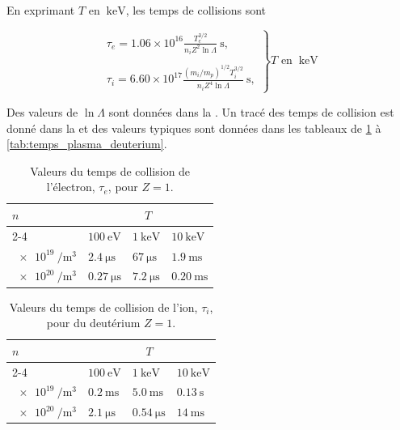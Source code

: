 \documentclass[main.tex]{subfiles}
\begin{document}
En exprimant \( T \) en \( \SI{}{\kilo\electronvolt} \), les temps de collisions sont

\begin{equation}
	\left. \begin{matrix}
		\tau_e = 1.06 \times 10^{16} \frac{T_e^{3/2}}{n_i Z^2 \ln \Lambda} \SI{}{\second},\\
		\\
		\tau_i = 6.60 \times 10^{17} \frac{\left( m_i/m_p\right)^{1/2}T_i^{3/2}}{n_i Z^4 \ln \Lambda} \SI{}{\second},
	\end{matrix} \right\rbrace T \text{ en } \SI{}{\kilo\electronvolt}
	\label{eq:temps_caracteristique_keV}
\end{equation}

Des valeurs de \( \ln\Lambda \) sont données dans la \color{red}{Section 14.5 (lien à rajouter quand elle sera faite)}\color{black}.
Un tracé des temps de collision est donné dans la \color{red}{Section 14.6 (lien à rajouter quand elle sera faite)}\color{black} et des valeurs typiques sont données dans les tableaux de \ref{tab:temps_electron} à \ref{tab:temps_plasma_deuterium}.

\begin{table}[ h ]
	\centering
	\caption{Valeurs du temps de collision de l'électron, \( \tau_e \), pour \( Z=1 \).}
	\begin{tabular}{l l l l}
	\hline
	\( n \) & \multicolumn{3}{c}{\( T \)}\\
	\cline{2-4}
	 & \( \SI{100}{\electronvolt} \) & \( \SI{1}{\kilo\electronvolt} \) & \( \SI{10}{\kilo\electronvolt} \)\\
	 \hline
	 \( \SI{e19}{\per\meter\cubed} \) & \( \SI{2.4}{\micro\second} \)& \( \SI{67}{\micro\second} \) & \( \SI{1.9}{\milli\second} \)\\
	 \( \SI{e20}{\per\meter\cubed} \) & \( \SI{0.27}{\micro\second} \)& \( \SI{7.2}{\micro\second} \) & \( \SI{0.20}{\milli\second} \)\\
	 \hline
	\end{tabular}
	\label{tab:temps_electron}
\end{table}

\begin{table}[ h ]
	\centering
	\caption{Valeurs du temps de collision de l'ion, \( \tau_i \), pour du deutérium \( Z=1 \).}
	\begin{tabular}{l l l l}
	\hline
	\( n \) & \multicolumn{3}{c}{\( T \)}\\
	\cline{2-4}
	 & \( \SI{100}{\electronvolt} \) & \( \SI{1}{\kilo\electronvolt} \) & \( \SI{10}{\kilo\electronvolt} \)\\
	 \hline
	 \( \SI{e19}{\per\meter\cubed} \) & \( \SI{0.2}{\milli\second} \)& \( \SI{5.0}{\milli\second} \) & \( \SI{0.13}{\second} \)\\
	 \( \SI{e20}{\per\meter\cubed} \) & \( \SI{2.1}{\micro\second} \)& \( \SI{0.54}{\micro\second} \) & \( \SI{14}{\milli\second} \)\\
	 \hline
	\end{tabular}
	\label{tab:temps_deuterium}
\end{table}
\end{document}
